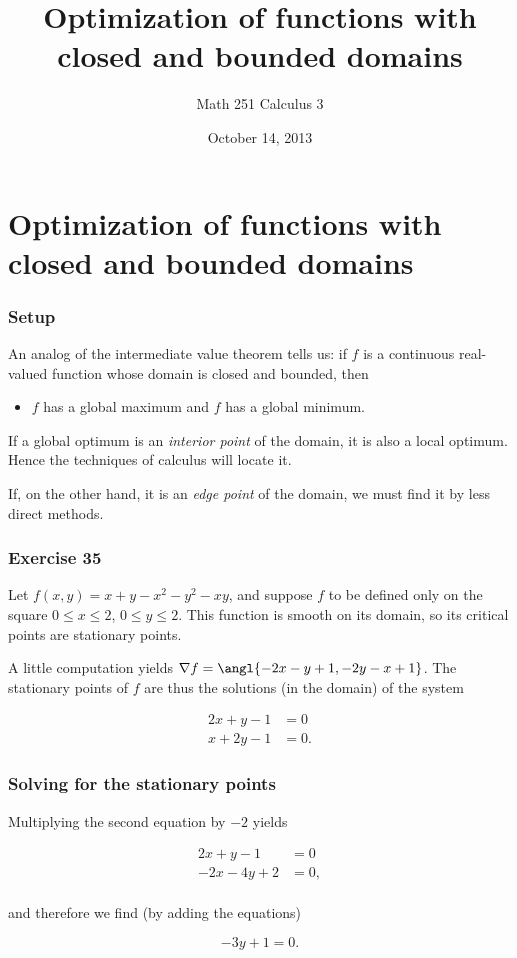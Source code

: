 \documentclass[%
  11pt,%
  ignorenonframetext,%
  xcolor={svgnames},%
  aspectratio=169%
]{beamer}
\title{Optimization of functions with closed and bounded domains}
\author{Math 251 Calculus 3}
\date{October 14, 2013}
\begin{document}
\frame{\titlepage}

\section{Optimization of functions with closed and bounded domains}

\begin{frame}\frametitle{Setup}

An analog of the intermediate value theorem tells us: if $f$ is a
continuous real-valued function whose domain is closed and bounded, then

\begin{itemize}

\item
  $f$ has a global maximum and $f$ has a global minimum.
\end{itemize}

If a global optimum is an \emph{interior point} of the domain, it is
also a local optimum. Hence the techniques of calculus will locate it.

If, on the other hand, it is an \emph{edge point} of the domain, we must
find it by less direct methods.

\end{frame}

\begin{frame}\frametitle{Exercise 35}

Let $f(x,y) = x + y - x^2 - y^2 - xy$, and suppose $f$ to be defined
only on the square $0 \leq x \leq 2$, $0 \leq y \leq 2$. This function
is smooth on its domain, so its critical points are stationary points.

A little computation yields
$\nabla f = \angl{-2x - y + 1, -2y - x + 1}$. The stationary points of
$f$ are thus the solutions (in the domain) of the system

\begin{align*}
    2x + y - 1 &= 0 \\
    x + 2y - 1 &= 0.
\end{align*}

\end{frame}

\begin{frame}\frametitle{Solving for the stationary points}

Multiplying the second equation by $-2$ yields

\begin{align*}
    2x + y - 1 &= 0 \\
    -2x - 4y + 2 &= 0, \\
\end{align*}

and therefore we find (by adding the equations)

\begin{equation*}
    -3y + 1 = 0.
\end{equation*}

\end{frame}
\end{document}
